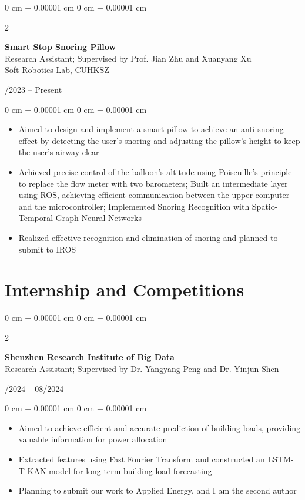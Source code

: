 \documentclass[10pt, letterpaper]{article}
\newenvironment{highlights}{
    \begin{itemize}[
        topsep=0.10 cm,
        parsep=0.10 cm,
        partopsep=0pt,
        itemsep=0pt,
        leftmargin=0 cm + 10pt
    ]
}{
    \end{itemize}
} %
\newenvironment{onecolentry}{
    \begin{adjustwidth}{
        0 cm + 0.00001 cm
    }{
        0 cm + 0.00001 cm
    }
}{
    \end{adjustwidth}
} %
\newenvironment{twocolentry}[2][]{
    \onecolentry
    \def\secondColumn{#2}
    \setcolumnwidth{\fill, 4.5 cm}
    \begin{paracol}{2}
}{
    \switchcolumn \raggedleft \secondColumn
    \end{paracol}
    \endonecolentry
} %
\begin{document}
        \vspace{0.2 cm}

        \begin{twocolentry}{
            09/2023 -- Present
        }
            \textbf{Smart Stop Snoring Pillow}\\
            Research Assistant; Supervised by Prof. Jian Zhu and Xuanyang Xu\\
            Soft Robotics Lab, CUHKSZ
        \end{twocolentry}

        \vspace{0.10 cm}
        \begin{onecolentry}
            \begin{highlights}
                \item Aimed to design and implement a smart pillow to achieve an anti-snoring effect by detecting the user's snoring and adjusting the pillow's height to keep the user's airway clear
                \item Achieved precise control of the balloon's altitude using Poiseuille's principle to replace the flow meter with two barometers; Built an intermediate layer using ROS, achieving efficient communication between the upper computer and the microcontroller; Implemented Snoring Recognition with Spatio-Temporal Graph Neural Networks
                \item Realized effective recognition and elimination of snoring and planned to submit to IROS
            \end{highlights}
        \end{onecolentry}



    
    \section{Internship and Competitions}

        \begin{twocolentry}{
            04/2024 -- 08/2024
        }
            \textbf{Shenzhen Research Institute of Big Data}\\
            Research Assistant; Supervised by Dr. Yangyang Peng and Dr. Yinjun Shen
        \end{twocolentry}

        \vspace{0.10 cm}
        \begin{onecolentry}
            \begin{highlights}
                \item Aimed to achieve efficient and accurate prediction of building loads, providing valuable information for power allocation
                \item Extracted features using Fast Fourier Transform and constructed an LSTM-T-KAN model for long-term building load forecasting
                \item Planning to submit our work to Applied Energy, and I am the second author
            \end{highlights}
        \end{onecolentry}
\end{document}
